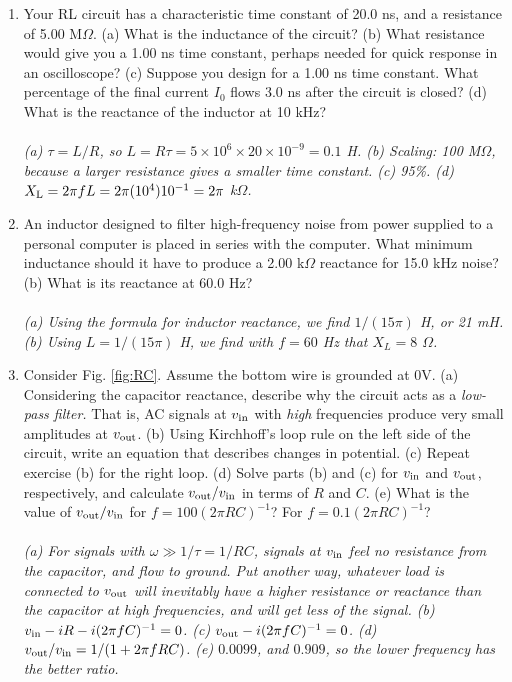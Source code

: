 \documentclass[12pt,twocolumn]{article}
\begin{document}
\begin{enumerate}
\item Your RL circuit has a characteristic time constant of 20.0 ns, and a resistance of 5.00 M$\Omega$. (a) What is the inductance of the circuit? (b) What resistance would give you a 1.00 ns time constant, perhaps needed for quick response in an oscilloscope? (c) Suppose you design for a 1.00 ns time constant.  What percentage of the final current $I_0$ flows 3.0 ns after the circuit is closed? (d) What is the reactance of the inductor at 10 kHz? \\ \\
\textit{(a) $\tau = L/R$, so $L = R\tau = 5\times 10^6 \times 20 \times 10^{-9} = 0.1$ H. (b) Scaling: 100 M$\Omega$, because a larger resistance gives a smaller time constant. (c) 95\%. (d) $X_{\rm L} = 2\pi f L = 2\pi(10^4)10^{-1} = 2\pi$ k$\Omega$.}
\item An inductor designed to filter high-frequency noise from power supplied to a personal computer is placed in series with the computer. What minimum inductance should it have to produce a 2.00 k$\Omega$ reactance for 15.0 kHz noise? (b) What is its reactance at 60.0 Hz? \\ \\
\textit{(a) Using the formula for inductor reactance, we find $1/(15\pi)$ H, or 21 mH. (b) Using $L = 1/(15\pi)$ H, we find with $f=60$ Hz that $X_L = 8$ $\Omega$.}
\item Consider Fig. \ref{fig:RC}.  Assume the bottom wire is grounded at 0V.  (a) Considering the capacitor reactance, describe why the circuit acts as a \textit{low-pass filter.}  That is, AC signals at $v_{\rm in}$ with \textit{high} frequencies produce very small amplitudes at $v_{\rm out}$. (b) Using Kirchhoff's loop rule on the left side of the circuit, write an equation that describes changes in potential.  (c) Repeat exercise (b) for the right loop.  (d) Solve parts (b) and (c) for $v_{\rm in}$ and $v_{\rm out}$, respectively, and calculate $v_{\rm out}/v_{\rm in}$ in terms of $R$ and $C$.  (e) What is the value of $v_{\rm out}/v_{\rm in}$ for $f = 100(2\pi R C)^{-1}$? For $f = 0.1(2\pi R C)^{-1}$? \\ \\
\textit{(a) For signals with $\omega \gg 1/\tau = 1/RC$, signals at $v_{\rm in}$ feel no resistance from the capacitor, and flow to ground.  Put another way, whatever load is connected to $v_{\rm out}$ will inevitably have a higher resistance or reactance than the capacitor at high frequencies, and will get less of the signal. (b) $v_{\rm in} - iR - i(2\pi fC)^{-1}=0$. (c) $v_{\rm out} - i(2\pi fC)^{-1}=0$.  (d) $v_{\rm out}/v_{\rm in} = 1/(1+2\pi fRC)$.  (e) $0.0099$, and $0.909$, so the lower frequency has the better ratio.}

\end{enumerate}
\end{document}
